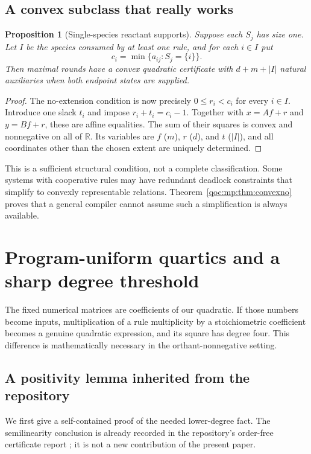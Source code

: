 \documentclass[11pt,letterpaper]{article}
\newtheorem{proposition}[theorem]{Proposition}
\theoremstyle{definition}
\theoremstyle{remark}
\newcommand{\R}{\mathbb R}
\begin{document}
\subsection{A convex subclass that really works}
\begin{proposition}[Single-species reactant supports]\label{qoc:mp:prop:unaryconvex}
Suppose each $S_j$ has size one. Let $I$ be the species consumed by at
least one rule, and for each $i\in I$ put
\[
 c_i=\min\{a_{ij}:S_j=\{i\}\}.
\]
Then maximal rounds have a convex quadratic certificate with
$d+m+|I|$ natural auxiliaries when both endpoint states are supplied.
\end{proposition}
\begin{proof}
The no-extension condition is now precisely
$0\le r_i<c_i$ for every $i\in I$. Introduce one slack $t_i$ and impose
$r_i+t_i=c_i-1$. Together with $x=Af+r$ and $y=Bf+r$, these are affine
equalities. The sum of their squares is convex and nonnegative on all
of $\R$. Its variables are $f$ ($m$), $r$ ($d$), and $t$ ($|I|$), and
all coordinates other than the chosen extent are uniquely determined.
\end{proof}

This is a sufficient structural condition, not a complete classification.
Some systems with cooperative rules may have redundant deadlock
constraints that simplify to convexly representable relations.
Theorem~\ref{qoc:mp:thm:convexno} proves that a general compiler cannot assume
such a simplification is always available.

\section{Program-uniform quartics and a sharp degree threshold}\label{qoc:mp:sec:uniform}
The fixed numerical matrices are coefficients of our quadratic. If those
numbers become inputs, multiplication of a rule multiplicity by a
stoichiometric coefficient becomes a genuine quadratic expression, and its
square has degree four. This difference is mathematically necessary in
the orthant-nonnegative setting.

\subsection{A positivity lemma inherited from the repository}
We first give a self-contained proof of the needed lower-degree fact.
The semilinearity conclusion is already recorded in the repository's
order-free certificate report \cite{mp:repo-canonical}; it is not a new
contribution of the present paper.
\end{document}
